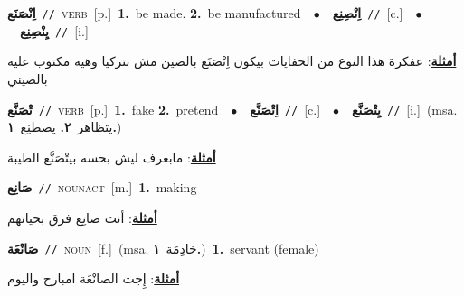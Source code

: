 \documentclass[10pt,a4paper,twoside]{article} %
\begin{document}
\begin{multicols}{2}
{\setlength\topsep{0pt}\textbf{\foreignlanguage{arabic}{اِنْصَنَع}}\ {\color{gray}\texttt{//}\color{black}}\ \textsc{verb}\ [p.]\ \textbf{1.}~be made.  \textbf{2.}~be manufactured\ \ $\bullet$\ \ \setlength\topsep{0pt}\textbf{\foreignlanguage{arabic}{اِنْصِنِع}}\ {\color{gray}\texttt{//}\color{black}}\ [c.]\ \ $\bullet$\ \ \setlength\topsep{0pt}\textbf{\foreignlanguage{arabic}{يِنْصِنِع}}\ {\color{gray}\texttt{//}\color{black}}\ [i.]\  \begin{flushright}\color{gray}\foreignlanguage{arabic}{\textbf{\underline{\foreignlanguage{arabic}{أمثلة}}}: عفكرة هذا النوع من الحفايات بيكون اِنْصَنَع بالصين مش بتركيا وهيه مكتوب عليه بالصيني}\end{flushright}\color{black}} \vspace{2mm}

{\setlength\topsep{0pt}\textbf{\foreignlanguage{arabic}{تْصَنَّع}}\ {\color{gray}\texttt{//}\color{black}}\ \textsc{verb}\ [p.]\ \textbf{1.}~fake  \textbf{2.}~pretend\ \ $\bullet$\ \ \setlength\topsep{0pt}\textbf{\foreignlanguage{arabic}{اِتْصَنَّع}}\ {\color{gray}\texttt{//}\color{black}}\ [c.]\ \ $\bullet$\ \ \setlength\topsep{0pt}\textbf{\foreignlanguage{arabic}{يِتْصَنَّع}}\ {\color{gray}\texttt{//}\color{black}}\ [i.]\ \color{gray}(msa. \foreignlanguage{arabic}{يتظاهر}~\foreignlanguage{arabic}{\textbf{٢.}}  \foreignlanguage{arabic}{يصطنِع}~\foreignlanguage{arabic}{\textbf{١.}})\color{black}\  \begin{flushright}\color{gray}\foreignlanguage{arabic}{\textbf{\underline{\foreignlanguage{arabic}{أمثلة}}}: مابعرف ليش بحسه بيتْصَنَّع الطيبة}\end{flushright}\color{black}} \vspace{2mm}

{\setlength\topsep{0pt}\textbf{\foreignlanguage{arabic}{صَانِع}}\ {\color{gray}\texttt{//}\color{black}}\ \textsc{noun\textunderscore act}\ [m.]\ \textbf{1.}~making\  \begin{flushright}\color{gray}\foreignlanguage{arabic}{\textbf{\underline{\foreignlanguage{arabic}{أمثلة}}}: أنت صانِع فرق بحياتهم}\end{flushright}\color{black}} \vspace{2mm}

{\setlength\topsep{0pt}\textbf{\foreignlanguage{arabic}{صَانْعَة}}\ {\color{gray}\texttt{//}\color{black}}\ \textsc{noun}\ [f.]\ \color{gray}(msa. \foreignlanguage{arabic}{خادِمَة}~\foreignlanguage{arabic}{\textbf{١.}})\color{black}\ \textbf{1.}~servant (female)\  \begin{flushright}\color{gray}\foreignlanguage{arabic}{\textbf{\underline{\foreignlanguage{arabic}{أمثلة}}}: إِجت الصانْعَة امبارح واليوم}\end{flushright}\color{black}} \vspace{2mm}


\end{multicols}
\end{document}
